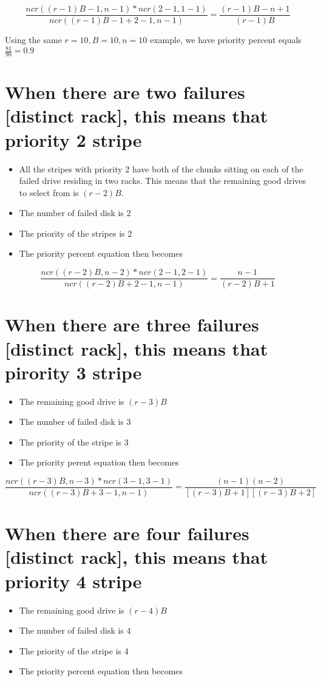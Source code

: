 \documentclass[journal]{IEEEtran}
\begin{document}
\begin{equation*}
  \frac{ncr((r-1)B-1, n-1)*ncr(2-1, 1-1)}{ncr((r-1)B-1+2-1, n-1)}=\frac{(r-1)B-n+1}{(r-1)B}
\end{equation*}

Using the same $r=10, B=10, n=10$ example, we have priority percent equals $\frac{81}{90}=0.9$

\section{When there are two failures [distinct rack], this means that \textbf{priority 2 stripe}}
\begin{itemize}
  \item All the stripes with priority 2 have both of the chunks sitting on each of the failed drive residing in two racks. This means that the remaining good drives to select from is $(r-2)B$.
  \item The number of failed disk is 2
  \item The priority of the stripes is 2
  \item The priority percent equation then becomes
\end{itemize}

\begin{equation*}
  \frac{ncr((r-2)B, n-2)*ncr(2-1, 2-1)}{ncr((r-2)B+2-1, n-1)}=\frac{n-1}{(r-2)B+1}
\end{equation*}

\section{When there are three failures [distinct rack], this means that \textbf{pirority 3 stripe} }
\begin{itemize}
  \item The remaining good drive is $(r-3)B$
  \item The number of failed disk is 3
  \item The priority of the stripe is 3
  \item The priority perent equation then becomes
\end{itemize}

\begin{equation*}
  \frac{ncr((r-3)B, n-3)*ncr(3-1, 3-1)}{ncr((r-3)B+3-1, n-1)}=\frac{(n-1)(n-2)}{[(r-3)B+1][(r-3)B+2]}
\end{equation*}

\section{When there are four failures [distinct rack], this means that \textbf{priority 4 stripe} }
\begin{itemize}
  \item The remaining good drive is $(r-4)B$
  \item The number of failed disk is 4
  \item The priority of the stripe is 4
  \item The priority percent equation then becomes
\end{itemize}
\end{document}

